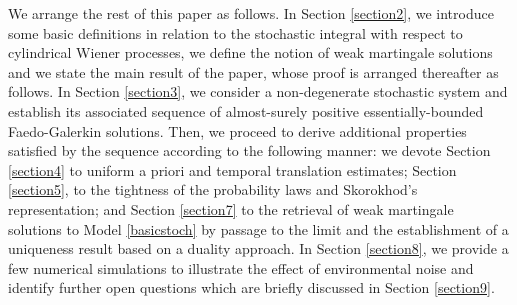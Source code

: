 \documentclass[10pt,number,preprint,times]{elsarticle}
\numberwithin{equation}{section} %
\begin{document}
We arrange the rest of this paper as follows. In Section \ref{section2}, we introduce some basic definitions in relation to the stochastic integral with respect to cylindrical Wiener processes, we define the notion of weak martingale solutions and we state the main result of the paper, whose proof is arranged thereafter as follows. In Section \ref{section3}, we consider a non-degenerate stochastic system and establish its associated sequence of almost-surely positive essentially-bounded Faedo-Galerkin solutions. Then, we proceed to derive additional properties satisfied by the sequence according to the following manner: we devote Section \ref{section4} to uniform a priori and temporal translation estimates; Section \ref{section5}, to the tightness of the probability laws and Skorokhod's representation; and Section \ref{section7} to the retrieval of weak martingale solutions to Model \eqref{basicstoch} by passage to the limit and the establishment of a uniqueness result based on a duality approach. In Section  \ref{section8}, we provide a few numerical simulations to illustrate the effect of environmental noise and identify further open questions which are briefly discussed in Section \ref{section9}.
\end{document}
